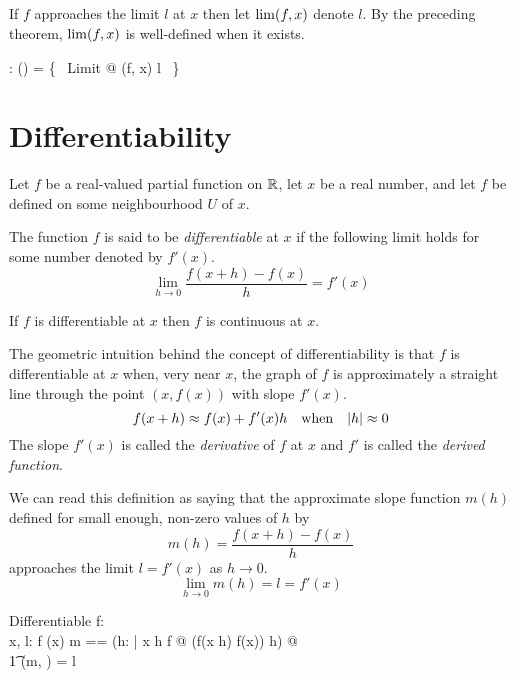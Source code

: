 \documentclass[11pt, oneside]{article}
\begin{document}
\subsection{}

If $f$ approaches the limit $l$ at $x$ then let $\operatorname{lim}(f,x)$ denote $l$.
By the preceding theorem, $\operatorname{lim}(f,x)$ is well-defined when it exists.

\begin{axdef}
	\limFR: (\R \pfun \R) \cross \R \pfun \R
\where
	\limFR = \{~ Limit @ (f, x) \mapsto l ~\}
\end{axdef}

\section{Differentiability}

Let $f$ be a real-valued partial function on $\mathbb{R}$, let $x$ be a real number,
and let $f$ be defined on some neighbourhood $U$ of $x$.

The function $f$ is said to be {\it differentiable} at $x$ if the following limit holds for some number denoted by $f'(x)$.
$$
\lim_{h \to 0} \frac{f(x+h) - f(x)}{h} = f'(x)
$$

\begin{remark}
If $f$ is differentiable at $x$ then $f$ is continuous at $x$.
\end{remark}

The geometric intuition behind the concept of differentiability is that $f$ is differentiable at $x$
when, very near $x$, the graph of $f$ is approximately a straight line through the point $(x, f(x))$ with slope $f'(x)$.
$$
f(x + h) \approx f(x) + f'(x) h \quad \text{when} \quad \abs{h} \approx 0
$$
The slope $f'(x)$ is called the {\it derivative} of $f$ at $x$
and $f'$ is called the {\it derived function}.

We can read this definition as saying that the approximate slope function $m(h)$ defined for 
small enough, non-zero values of $h$ by
$$
	m(h) = \frac{f(x + h) - f(x)}{h}
$$
approaches the limit $l = f'(x)$ as $h \to 0$.
$$
	\lim_{h\to 0}{m(h)} = l = f'(x)
$$

\begin{schema}{Differentiable}
	f: \R \pfun \R \\
	x, l: \R
\where
	f \in \CzeroR(x)
\also
	\LET m == (\lambda h: \Rnz | x \addR h \in \dom f @ (f(x \addR h) \subR f(x)) \divR h) @ \\
	\t1	\limFR(m, \zeroR) = l
\end{schema}
\end{document}
